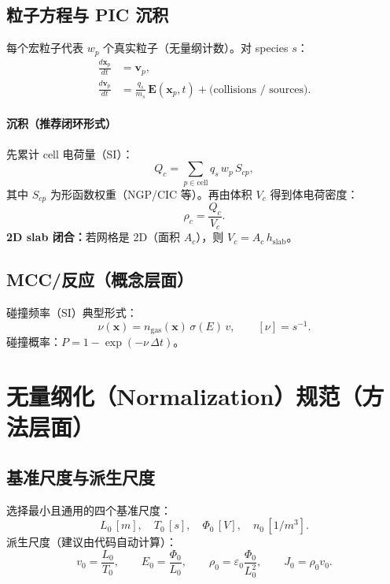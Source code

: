 \documentclass[11pt,a4paper]{ctexart}
\begin{document}
\subsection{粒子方程与 PIC 沉积}
每个宏粒子代表 $w_p$ 个真实粒子（无量纲计数）。对 species $s$：
\begin{align}
\frac{d\bm{x}_p}{dt} &= \bm{v}_p,\\
\frac{d\bm{v}_p}{dt} &= \frac{q_s}{m_s}\,\bm{E}(\bm{x}_p,t) + \text{(collisions / sources)}.
\end{align}

\paragraph{沉积（推荐闭环形式）}
先累计 cell 电荷量（SI）：
\begin{equation}
Q_c = \sum_{p\in\text{cell}} q_s\,w_p\,S_{cp},
\end{equation}
其中 $S_{cp}$ 为形函数权重（NGP/CIC 等）。再由体积 $V_c$ 得到体电荷密度：
\begin{equation}
\rho_c = \frac{Q_c}{V_c}.
\end{equation}
\textbf{2D slab 闭合：}若网格是 2D（面积 $A_c$），则 $V_c=A_c\,h_{\mathrm{slab}}$。

\subsection{MCC/反应（概念层面）}
碰撞频率（SI）典型形式：
\begin{equation}
\nu(\bm{x}) = n_{\mathrm{gas}}(\bm{x})\,\sigma(E)\,v, \qquad [\nu]=\si{s^{-1}}.
\end{equation}
碰撞概率：$P=1-\exp(-\nu\,\Delta t)$。

\section{无量纲化（Normalization）规范（方法层面）}
\subsection{基准尺度与派生尺度}
选择最小且通用的四个基准尺度：
\begin{equation}
L_0\,[\si{m}],\quad T_0\,[\si{s}],\quad \Phi_0\,[\si{V}],\quad n_0\,[\si{1/m^3}].
\end{equation}
派生尺度（建议由代码自动计算）：
\begin{equation}
 v_0=\frac{L_0}{T_0},\qquad E_0=\frac{\Phi_0}{L_0},\qquad \rho_0=\varepsilon_0\frac{\Phi_0}{L_0^2},\qquad J_0=\rho_0 v_0.
\end{equation}
\end{document}
